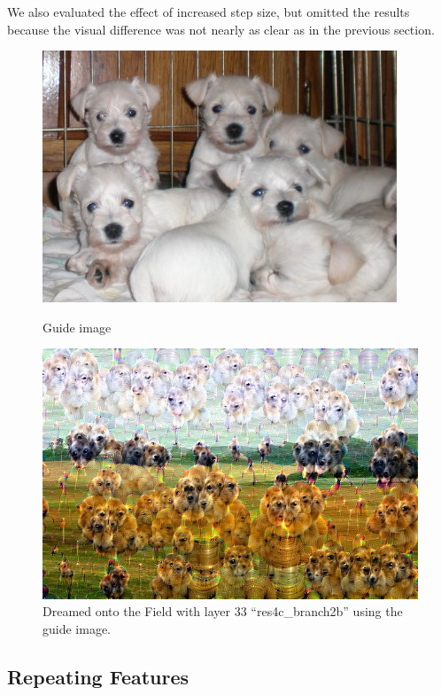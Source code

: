 We also evaluated the effect of increased step size, but omitted the results because the visual difference was not nearly as clear as in the previous section.

\begin{figure}[H]
	\centering
	\includegraphics[width=1\linewidth]{img/guide.jpg}
	\caption{Guide image\cite{imgpuppies}}
	\label{fig:guide}
	\endminipage\hfill
	\centering
	\includegraphics[width=1\linewidth]{img/guide_dream.jpg}
	\caption{Dreamed onto the Field with layer 33 \enquote{res4c\_branch2b} using the guide image.}
	\label{fig:guide_dream}
	\endminipage\hfill
\end{figure}



\subsection{Repeating Features}
\label{sec:repeating-features}

